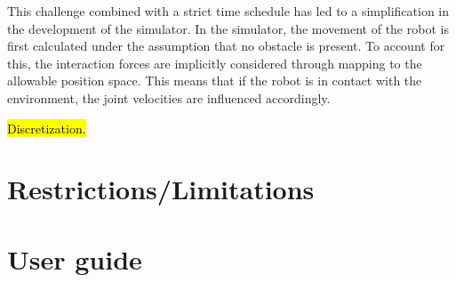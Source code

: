 This challenge combined with a strict time schedule has led to a simplification in the development of the simulator. In the simulator, the movement of the robot is first calculated under the assumption that no obstacle is present. To account for this, the interaction forces are implicitly considered through mapping to the allowable position space. This means that if the robot is in contact with the environment, the joint velocities are influenced accordingly.

\hl{Discretization.}





\section{Restrictions/Limitations}

\section{User guide}

